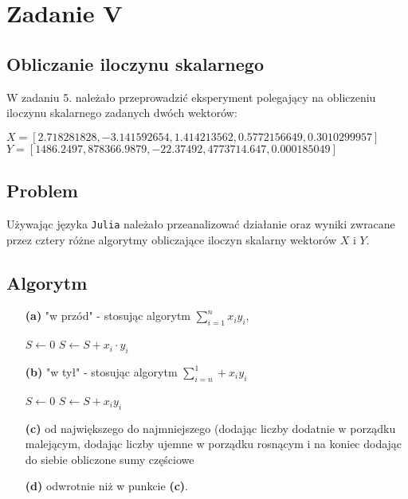 \documentclass{article}
\begin{document}
\section{Zadanie V}

\subsection{Obliczanie iloczynu skalarnego}
W zadaniu 5. należało przeprowadzić eksperyment polegający na obliczeniu iloczynu skalarnego zadanych dwóch wektorów:
\begin{center}
        $ X = [2.718281828, -3.141592654, 1.414213562, 0.5772156649, 0.3010299957] $ 
        $ Y = [1486.2497, 878366.9879, -22.37492, 4773714.647, 0.000185049] $
\end{center}

\subsection{Problem}
Używając języka \texttt{Julia} należało przeanalizować działanie oraz wyniki zwracane przez cztery różne algorytmy obliczające iloczyn skalarny wektorów $X$ i $Y$.

\subsection{Algorytm}
\begin{itemize}
    \item[\textbf{(a)}] "w przód" - stosując algorytm $\sum_{i=1}^{n} x_{i}y_{i}$,
        \begin{algorithm}
            \begin{algorithmic}[1]
                \State $S \gets 0$
                    \State $S \gets S + x_{i} \cdot y_{i}$
                \EndFor
            \end{algorithmic}
        \end{algorithm}
    \item[\textbf{(b)}] "w tył" - stosując algorytm $\sum_{i=n}^{1} + x_{i}y_{i}$
        \begin{algorithm}
            \begin{algorithmic}[1]
                \State $S \gets 0$
                    \State $S \gets S + x_{i}y_{i}$
                \EndFor
            \end{algorithmic}
        \end{algorithm}
    \item[\textbf{(c)}] od największego do najmniejszego (dodając liczby dodatnie w porządku malejącym, dodając liczby ujemne w porządku rosnącym i na koniec dodając do siebie obliczone sumy częściowe
    \item[\textbf{(d)}] odwrotnie niż w punkcie \textbf{(c)}.
\end{itemize}
\end{document}
